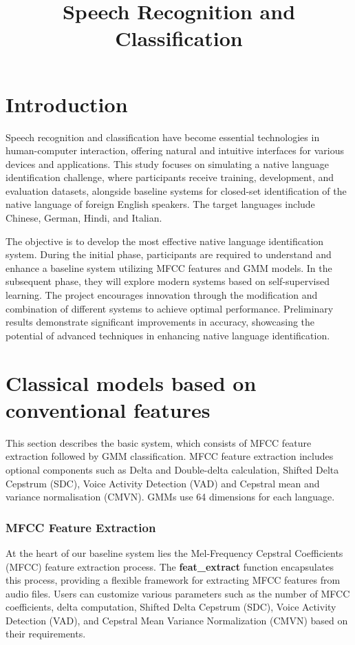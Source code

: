 \documentclass{Interspeech2024}
\title{Speech Recognition and Classification}
\begin{document}
\maketitle
\section{Introduction}

Speech recognition and classification have become essential technologies in human-computer interaction, offering natural and intuitive interfaces for various devices and applications. This study focuses on simulating a native language identification challenge, where participants receive training, development, and evaluation datasets, alongside baseline systems for closed-set identification of the native language of foreign English speakers. The target languages include Chinese, German, Hindi, and Italian.

The objective is to develop the most effective native language identification system. During the initial phase, participants are required to understand and enhance a baseline system utilizing MFCC features and GMM models. In the subsequent phase, they will explore modern systems based on self-supervised learning. The project encourages innovation through the modification and combination of different systems to achieve optimal performance. Preliminary results demonstrate significant improvements in accuracy, showcasing the potential of advanced techniques in enhancing native language identification.

\section{Classical models based on conventional features}

This section describes the basic system, which consists of MFCC feature extraction followed by GMM classification. MFCC feature extraction includes optional components such as Delta and Double-delta calculation, Shifted Delta Cepstrum (SDC), Voice Activity Detection (VAD) and Cepstral mean and variance normalisation (CMVN). GMMs use 64 dimensions for each language.

\subsubsection{MFCC Feature Extraction}

At the heart of our baseline system lies the Mel-Frequency Cepstral Coefficients (MFCC) feature extraction process. The \textbf{feat\_extract} function encapsulates this process, providing a flexible framework for extracting MFCC features from audio files. Users can customize various parameters such as the number of MFCC coefficients, delta computation, Shifted Delta Cepstrum (SDC), Voice Activity Detection (VAD), and Cepstral Mean Variance Normalization (CMVN) based on their requirements.
\end{document}
